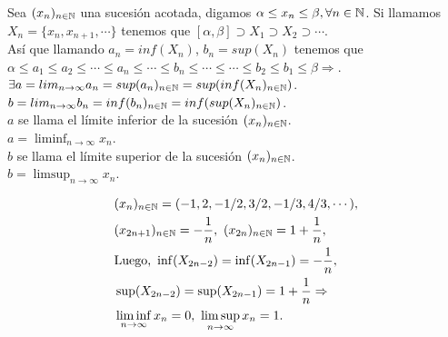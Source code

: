 \begin{definition}
  Sea $(x_n)_{n \in \mathbb{N}}$ una sucesión acotada, digamos $\alpha \leq x_n \leq \beta, \forall n \in \mathbb{N}$.
  Si llamamos $X_n = \{ x_n, x_{n+1}, \cdots \}$ tenemos que $[\alpha, \beta] \supset X_1 \supset X_2 \supset \cdots$. \\
  Así que llamando $a_n = inf(X_n)$, $b_n = sup(X_n)$ tenemos que \\
  $\alpha \leq a_1 \leq a_2 \leq \cdots \leq a_n \leq \cdots \leq b_n \leq \cdots \leq \cdots \leq b_2 \leq b_1 \leq \beta \Rightarrow$. \\
  $\exists a = lim_{n \to \infty} a_n = sup(a_n)_{n \in \mathbb{N}} = sup(inf(X_n)_{n \in \mathbb{N}})$. \\
  $b = lim_{n \to \infty} b_n = inf(b_n)_{n \in \mathbb{N}} = inf(sup(X_n)_{n \in \mathbb{N}})$. \\

  $a$ se llama el límite inferior de la sucesión $(x_n)_{n \in \mathbb{N}}$. \\
  $a = \liminf_{n \to \infty} x_n$. \\

  $b$ se llama el límite superior de la sucesión $(x_n)_{n \in \mathbb{N}}$. \\
  $b = \limsup_{n \to \infty} x_n$.
\end{definition}

\clearpage

\begin{eg}
  \begin{align*}
     & (x_n)_{n \in \mathbb{N}} = (-1, 2, -1/2, 3/2, -1/3, 4/3, \cdots),                      \\
     & (x_{2n+1})_{n \in \mathbb{N}} = -\frac{1}{n}, \ (x_{2n})_{n \in \mathbb{N}} = 1 + \frac{1}{n}, \\
     & \text{Luego, } \inf(X_{2n-2}) = \inf(X_{2n-1}) = -\frac{1}{n},                 \\
     & \sup(X_{2n-2}) = \sup(X_{2n-1}) = 1 + \frac{1}{n} \Rightarrow                  \\
     & \liminf_{n \to \infty} x_n = 0, \ \limsup_{n \to \infty} x_n = 1.
  \end{align*}
\end{eg}
